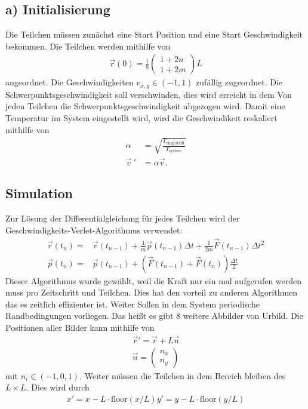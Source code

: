 \subsection*{a) Initialisierung}
Die Teilchen müssen zunächst eine Start Position und eine Start Geschwindigkeit bekommen.
Die Teilchen werden mithilfe von
\begin{align*}
\vec{r}(0)=\frac{1}{8}
\begin{pmatrix}
1+2n\\1+2m
\end{pmatrix}L
\end{align*}
angeordnet.
Die Geschwindigkeiten $v_{x,y}\in(-1,1)$ zufällig zugeordnet.
Die Schwerpunktsgeschwindigkeit soll verschwinden, dies wird erreicht in dem Von jeden Teilchen die Schwerpunktsgeschwindigkeit abgezogen wird.
Damit eine Temperatur im System eingestellt wird, wird die Geschwindikeit reskaliert mithilfe von
\begin{align}
	\alpha &= \sqrt{\frac{T_\text{eingestellt}}{T_\text{system}}}\\
	\vec{v}\ '&=\alpha\vec{v}.
\end{align}
\subsection*{Simulation}
Zur Lösung der Differentialgleichung für jedes Teilchen wird der Geschwindigkeits-Verlet-Algorithmus verwendet:
\begin{align*}
	\vec{r}(t_n)=&\vec{r}(t_{n-1})+\frac{1}{m}\vec{p}(t_{n-1})\Delta t + \frac{1}{2m}\vec{F}(t_{n-1})\Delta t^2\\
	\vec{p}(t_n)=&\vec{p}(t_{n-1}) + \left( \vec{F}(t_{n-1}) + \vec{F}(t_n) \right)\frac{\Delta t}{2}
\end{align*}
Dieser Algorithmus wurde gewählt, weil die Kraft nur ein mal aufgerufen werden muss pro Zeitschritt und Teilchen.
Dies hat den vorteil zu anderen Algorithmen das es zeitlich effizienter ist.
Weiter Sollen in dem System periodische Randbedingungen vorliegen.
Das heißt es gibt 8 weitere Abbilder von Urbild.
Die Positionen aller Bilder kann mithilfe von
\begin{align*}
	\vec{r}' = \vec{r}+L\vec{n}\\
	\vec{n}=
	\begin{pmatrix}
		n_x\\
		n_y
	\end{pmatrix}
\end{align*}
mit $n_i\in(-1,0,1)$.
Weiter müssen die Teilchen in dem Bereich bleiben des $L\times L$.
Dies wird durch
\begin{align*}
	x'=x-L\cdot \text{floor}(x/L)
	y'=y-L\cdot \text{floor}(y/L)
\end{align*}
